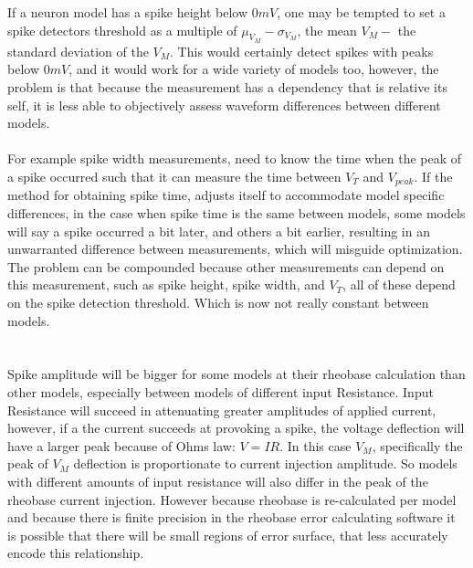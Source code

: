     If a neuron model has a spike height below $0mV$, one may be tempted to set a spike detectors threshold as a multiple of $\mu_{V_{M}} - \sigma_{{V_{M}}}$, the mean $V_{M} -$ the standard deviation of the $V_{M}$. This would certainly detect spikes with peaks below $0mV$, and it would work for a wide variety of models too, however, the problem is that because the measurement has a dependency that is relative its self, it is less able to objectively assess waveform differences between  different models.\\
    \\
    For example spike width measurements, need to know the time when the peak of a spike occurred such that it can measure the time between $V_{T}$ and $V_{peak}$. If the method for obtaining spike time, adjusts itself to accommodate model specific differences, in the case when spike time is the same between models, some models will say a spike occurred a bit later, and others a bit earlier, resulting in an unwarranted difference between measurements, which will misguide optimization. The problem can be compounded because other measurements can depend on this measurement, such as spike height, spike width, and $V_{T}$, all of these depend on the spike detection threshold. Which is now not really constant between models.\\
    \\
    \\
    Spike amplitude will be bigger for some models at their rheobase calculation than other models, especially between models of different input Resistance. Input Resistance will succeed in attenuating greater amplitudes of applied current, however, if a the current succeeds at provoking a spike, the voltage deflection will have a larger peak because of Ohms law: $V=IR$. In this case $V_{M}$, specifically the peak of $V_{M}$ deflection is proportionate to current injection amplitude. So models with different amounts of input resistance will also differ in the peak of the rheobase current injection. However because rheobase is re-calculated per model and because there is finite precision in the rheobase error calculating software it is possible that there will be small regions of error surface, that less accurately encode this relationship.\\
